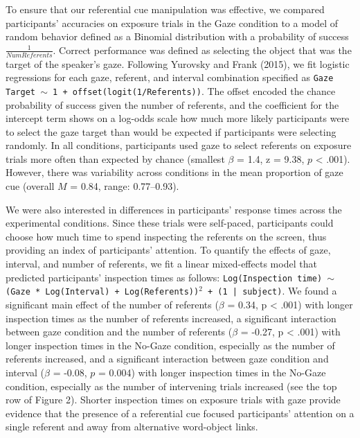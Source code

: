 \documentclass[authoryear, review]{elsarticle}
\begin{document}
To ensure that our referential cue manipulation was effective, we
compared participants' accuracies on exposure trials in the Gaze
condition to a model of random behavior defined as a Binomial
distribution with a probability of success \(\frac{1}{Num Referents}\).
Correct performance was defined as selecting the object that was the
target of the speaker's gaze. Following Yurovsky and Frank (2015), we
fit logistic regressions for each gaze, referent, and interval
combination specified as
\texttt{Gaze Target $\sim$ 1 + offset(logit(1/Referents))}. The offset
encoded the chance probability of success given the number of referents,
and the coefficient for the intercept term shows on a log-odds scale how
much more likely participants were to select the gaze target than would
be expected if participants were selecting randomly. In all conditions,
participants used gaze to select referents on exposure trials more often
than expected by chance (smallest \(\beta\) = 1.4, z = 9.38, \(p\)
\textless{} .001). However, there was variability across conditions in
the mean proportion of gaze cue (overall \(M\) = 0.84, range:
0.77--0.93).

We were also interested in differences in participants' response times
across the experimental conditions. Since these trials were self-paced,
participants could choose how much time to spend inspecting the
referents on the screen, thus providing an index of participants'
attention. To quantify the effects of gaze, interval, and number of
referents, we fit a linear mixed-effects model that predicted
participants' inspection times as follows:
\texttt{Log(Inspection time) $\sim$ (Gaze * Log(Interval) + Log(Referents))$^2$ + (1 | subject)}.
We found a significant main effect of the number of referents (\(\beta\)
= 0.34, p \textless{} .001) with longer inspection times as the number
of referents increased, a significant interaction between gaze condition
and the number of referents (\(\beta\) = -0.27, p \textless{} .001) with
longer inspection times in the No-Gaze condition, especially as the
number of referents increased, and a significant interaction between
gaze condition and interval (\(\beta\) = -0.08, \(p\) = 0.004) with
longer inspection times in the No-Gaze condition, especially as the
number of intervening trials increased (see the top row of Figure 2).
Shorter inspection times on exposure trials with gaze provide evidence
that the presence of a referential cue focused participants' attention
on a single referent and away from alternative word-object links.
\end{document}
